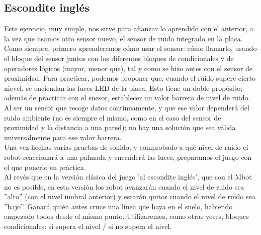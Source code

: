 \subsection{Escondite inglés}\label{ej:esconIngles}
Este ejercicio, muy simple, nos sirve para afianzar lo aprendido con el anterior, a la vez que usamos otro sensor nuevo, el sensor de ruido integrado en la placa.\\
Como siempre, primero aprenderemos cómo usar el sensor: cómo llamarlo, usando el bloque del sensor juntos con los diferentes bloques de condicionales y de operadores lógicos (mayor, menor que), tal y como se hizo antes con el sensor de proximidad. Para practicar, podemos proponer que, cuando el ruido supere cierto nievel, se enciendan las luces LED de la placa. Esto tiene un doble propósito; además de practicar con el snesor, establecer un valor barrera de nivel de ruido. Al ser un sensor que recoge datos continuamente, y que ese valor dependerá del ruido ambiente (no es siempre el mismo, como en el caso del sensor de proximidad y la distancia a una pared); no hay una solución que sea válida universalmente para ese valor barrera. \\
Una vez hechas varias pruebas de sonido, y comprobado a qué nivel de ruido el robot reaccionará a una palmada y encenderá las luces, preparamos el juego con el que ponerlo en práctica. \\
Al revés que en la versión clásica del juego 'al escondite inglés', que con el Mbot no es posible, en esta versión los robot avanzarán cuando el nivel de ruido sea ''alto'' (con el nivel umbral anterior) y estarán quitos cuando el nivel de ruido sea ''bajo''. Ganará quién antes cruce una línea que haya en el suelo, habiendo empezado todos desde el mismo punto. Utilizaremos, como otras veces, bloques condicionales: si supera el nivel / si no supera el nivel.
